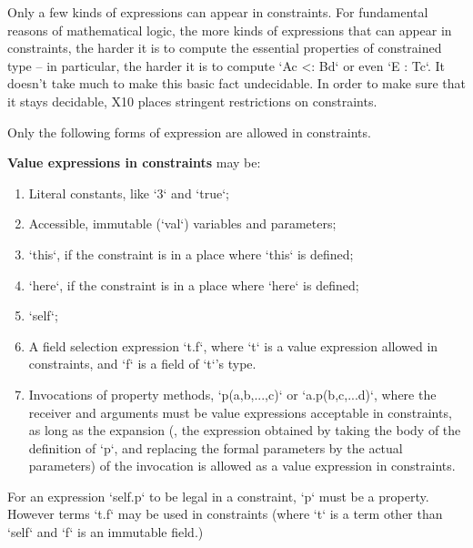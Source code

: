 Only a few kinds of expressions can appear in constraints.  For fundamental
reasons of mathematical logic, the more kinds of expressions that can appear
in constraints, the harder it is to compute the essential properties of
constrained type -- in particular, the harder it is to compute 
\xcd`A{c} <: B{d}` or even \xcd`E : T{c}`.  It doesn't take much to make this
basic fact undecidable. 
In order to make sure that it stays decidable, X10 places stringent restrictions on
constraints.  

Only the following forms of expression are allowed in constraints.  

{\bf Value expressions in constraints} may be: 
\begin{enumerate}
\item Literal constants, like \xcd`3` and \xcd`true`;
\item Accessible, immutable (\xcd`val`) variables and parameters;
\item \xcd`this`, if the constraint is in a place where \xcd`this` is defined;
\item \xcd`here`, if the constraint is in a place where \xcd`here` is defined;
\item \xcd`self`;
\item A field selection expression \xcd`t.f`, where \xcd`t` is a value
      expression allowed in constraints, and \xcd`f` is a field of \xcd`t`'s
      type.    
 \item Invocations of property methods,  \xcd`p(a,b,...,c)` or
      \xcd`a.p(b,c,...d)`, where the receiver and arguments must be
       value expressions acceptable in constraints, as long as the expansion
       (\viz, the expression obtained by taking the body of the definition of
       \xcd`p`, and replacing the formal parameters by the actual parameters)
       of the invocation is allowed as a value expression in constraints.  
\end{enumerate}
For an expression \xcd`self.p` to be legal in a constraint, 
\xcd`p` must be 
a property. However terms \xcd`t.f` may be
used in constraints (where \xcd`t` is a term other than \xcd`self` and
\xcd`f` is an immutable field.)

